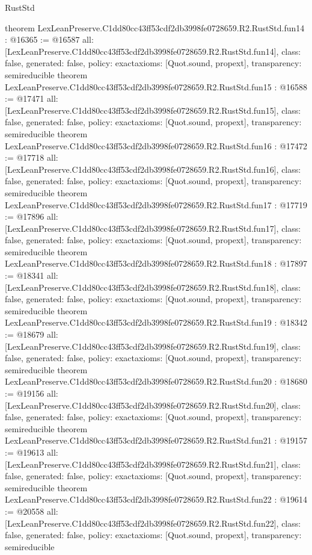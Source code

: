 \begin{lexlean}{RustStd}
\begin{coremodule}
{}
theorem LexLeanPreserve.C1dd80cc43ff53cdf2db3998fe0728659.R2.RustStd.fun14 : @16365 := @16587 {
  all: [LexLeanPreserve.C1dd80cc43ff53cdf2db3998fe0728659.R2.RustStd.fun14],
  class: false,
  generated: false,
  policy: exact{axioms: [Quot.sound, propext]},
  transparency: semireducible
}
theorem LexLeanPreserve.C1dd80cc43ff53cdf2db3998fe0728659.R2.RustStd.fun15 : @16588 := @17471 {
  all: [LexLeanPreserve.C1dd80cc43ff53cdf2db3998fe0728659.R2.RustStd.fun15],
  class: false,
  generated: false,
  policy: exact{axioms: [Quot.sound, propext]},
  transparency: semireducible
}
theorem LexLeanPreserve.C1dd80cc43ff53cdf2db3998fe0728659.R2.RustStd.fun16 : @17472 := @17718 {
  all: [LexLeanPreserve.C1dd80cc43ff53cdf2db3998fe0728659.R2.RustStd.fun16],
  class: false,
  generated: false,
  policy: exact{axioms: [Quot.sound, propext]},
  transparency: semireducible
}
theorem LexLeanPreserve.C1dd80cc43ff53cdf2db3998fe0728659.R2.RustStd.fun17 : @17719 := @17896 {
  all: [LexLeanPreserve.C1dd80cc43ff53cdf2db3998fe0728659.R2.RustStd.fun17],
  class: false,
  generated: false,
  policy: exact{axioms: [Quot.sound, propext]},
  transparency: semireducible
}
theorem LexLeanPreserve.C1dd80cc43ff53cdf2db3998fe0728659.R2.RustStd.fun18 : @17897 := @18341 {
  all: [LexLeanPreserve.C1dd80cc43ff53cdf2db3998fe0728659.R2.RustStd.fun18],
  class: false,
  generated: false,
  policy: exact{axioms: [Quot.sound, propext]},
  transparency: semireducible
}
theorem LexLeanPreserve.C1dd80cc43ff53cdf2db3998fe0728659.R2.RustStd.fun19 : @18342 := @18679 {
  all: [LexLeanPreserve.C1dd80cc43ff53cdf2db3998fe0728659.R2.RustStd.fun19],
  class: false,
  generated: false,
  policy: exact{axioms: [Quot.sound, propext]},
  transparency: semireducible
}
theorem LexLeanPreserve.C1dd80cc43ff53cdf2db3998fe0728659.R2.RustStd.fun20 : @18680 := @19156 {
  all: [LexLeanPreserve.C1dd80cc43ff53cdf2db3998fe0728659.R2.RustStd.fun20],
  class: false,
  generated: false,
  policy: exact{axioms: [Quot.sound, propext]},
  transparency: semireducible
}
theorem LexLeanPreserve.C1dd80cc43ff53cdf2db3998fe0728659.R2.RustStd.fun21 : @19157 := @19613 {
  all: [LexLeanPreserve.C1dd80cc43ff53cdf2db3998fe0728659.R2.RustStd.fun21],
  class: false,
  generated: false,
  policy: exact{axioms: [Quot.sound, propext]},
  transparency: semireducible
}
theorem LexLeanPreserve.C1dd80cc43ff53cdf2db3998fe0728659.R2.RustStd.fun22 : @19614 := @20558 {
  all: [LexLeanPreserve.C1dd80cc43ff53cdf2db3998fe0728659.R2.RustStd.fun22],
  class: false,
  generated: false,
  policy: exact{axioms: [Quot.sound, propext]},
  transparency: semireducible
}
\end{coremodule}
\end{lexlean}
